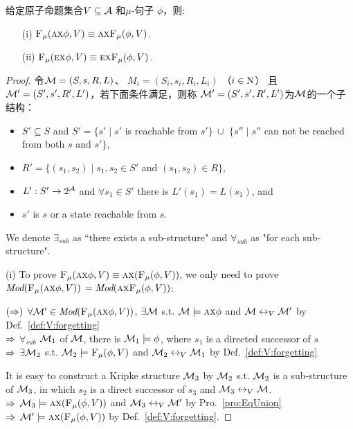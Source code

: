 \begin{proposition}[同质性]\label{chapter06:pro:mu:forget:2}
	给定原子命题集合$V\subseteq\cal A$ 和$\mu$-句子 $\phi$，则: %
	\begin{itemize}
		\item[(i)] ${\textsc{F}_{\textsc{$\mu$}}}(\textsc{a}\textsc{x}\phi,V)\equiv \textsc{a}\textsc{x} {\textsc{F}_{\textsc{$\mu$}}}(\phi,V)$.
		\item[(ii)] ${\textsc{F}_{\textsc{$\mu$}}}(\textsc{e}\textsc{x}\phi,V)\equiv\textsc{e}\textsc{x} {\textsc{F}_{\textsc{$\mu$}}}(\phi,V)$.
	\end{itemize}
\end{proposition}
\begin{proof}
	令${\cal M}=(S, s,R, L)$、 $M_i = (S_i, s_i, R_i, L_i)$ （$i \in \textmd{N}$） 且 ${\cal M}'=(S', s', R', L')$，若下面条件满足，则称 ${\cal M}'=(S', s', R', L')$为${\cal M}$的一个子结构：
	\begin{itemize}
		\item $S' \subseteq S$ and $S'=\{s' \mid s'$ is reachable from $s'\}\ \cup $ $\{s'' \mid s''$ can not be reached from both $s$ and $s'$$\}$,
		\item $R' =\{(s_1, s_2)\mid s_1, s_2 \in S'$ and $(s_1, s_2) \in R\}$,
		\item $L': S' \rightarrow 2^{\cal A}$ and $\forall s_1 \in S'$ there is $L'(s_1) = L(s_1)$, and
		\item $s'$ is $s$ or a state reachable from $s$.
	\end{itemize}
	
	We denote $\exists_{sub}$ as ``there exists a sub-structure" and $\forall_{sub}$ as "for each sub-structure".
	
	(i) To prove ${\textsc{F}_{\textsc{$\mu$}}}(\textsc{a} \textsc{x} \phi, V) \equiv \textsc{a} \textsc{x}({\textsc{F}_{\textsc{$\mu$}}}(\phi, V))$, we only need to prove $\textit{Mod}({\textsc{F}_{\textsc{$\mu$}}}(\textsc{a} \textsc{x} \phi, V))$ $= \textit{Mod}( \textsc{a}\textsc{x}{\textsc{F}_{\textsc{$\mu$}}}(\phi, V))$:
	
	$(\Rightarrow)$ $\forall {\cal M}' \in \textit{Mod}({\textsc{F}_{\textsc{$\mu$}}}(\textsc{a} \textsc{x} \phi, V))$, $\exists {\cal M}$ s.t. ${\cal M} \models \textsc{a} \textsc{x} \phi$ and ${\cal M} \leftrightarrow_V {\cal M}'$  by Def.~\ref{def:V:forgetting}\\
	$\Rightarrow$ $\forall_{sub}$ ${\cal M}_1$ of ${\cal M}$,  there is ${\cal M}_1 \models \phi$, where $s_1$ is a directed successor of $s$ \\
	$\Rightarrow$ $\exists {\cal M}_2$ s.t. ${\cal M}_2 \models {\textsc{F}_{\textsc{$\mu$}}}(\phi,V)$ and ${\cal M}_2 \leftrightarrow_V {\cal M}_1$ by Def.~\ref{def:V:forgetting}
	
	It is easy to construct a Kripke structure ${\cal M}_3$ by ${\cal M}_2$ s.t. ${\cal M}_2$ is a sub-structure of ${\cal M}_3$, in which $s_2$ is a direct successor of $s_3$ and ${\cal M}_3 \leftrightarrow_V {\cal M}$.\\
	$\Rightarrow$ ${\cal M}_3 \models \textsc{a} \textsc{x} ({\textsc{F}_{\textsc{$\mu$}}}(\phi,V))$ and ${\cal M}_3 \leftrightarrow_V {\cal M}'$ by Pro.~\ref{pro:EqUnion}\\
	$\Rightarrow$ ${\cal M}' \models \textsc{a} \textsc{x} ({\textsc{F}_{\textsc{$\mu$}}}(\phi,V))$  by Def.~\ref{def:V:forgetting}.
	

\end{proof}
